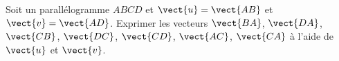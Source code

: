 
\begin{exercice}\label{exosmath-0055}

    Soit un parallélogramme \( ABCD\) et \( \vect{ u }=\vect{ AB }\) et \( \vect{ v }=\vect{ AD }\). Exprimer les vecteurs $\vect{ BA}$, $\vect{ DA}$, $\vect{ CB}$, $\vect{ DC}$, $\vect{ CD}$, $\vect{ AC}$, $\vect{ CA }$ à l'aide de \( \vect{ u }\) et \( \vect{ v }\).

\end{exercice}
